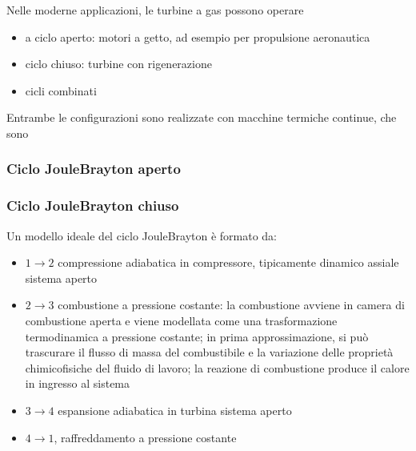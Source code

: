 \documentclass[letterpaper,10pt,italian]{jupyterBook}
\begin{document}
\sphinxAtStartPar
Nelle moderne applicazioni, le turbine a gas possono operare
\begin{itemize}
\item {} 
\sphinxAtStartPar
a ciclo aperto: motori a getto, ad esempio per propulsione aeronautica

\item {} 
\sphinxAtStartPar
ciclo chiuso: turbine con rigenerazione

\item {} 
\sphinxAtStartPar
cicli combinati

\end{itemize}

\sphinxAtStartPar
Entrambe le configurazioni sono realizzate con macchine termiche continue, che sono   


\subsubsection{Ciclo Joule\sphinxhyphen{}Brayton aperto}
\label{\detokenize{ch/thermodynamics/heat-engine-joule-brayton:ciclo-joule-brayton-aperto}}

\subsubsection{Ciclo Joule\sphinxhyphen{}Brayton chiuso}
\label{\detokenize{ch/thermodynamics/heat-engine-joule-brayton:ciclo-joule-brayton-chiuso}}
\sphinxAtStartPar
Un modello ideale del ciclo Joule\sphinxhyphen{}Brayton è formato da:
\begin{itemize}
\item {} 
\sphinxAtStartPar
\(1 \rightarrow 2\) compressione adiabatica in compressore, tipicamente dinamico assiale \sphinxhyphen{} sistema aperto

\item {} 
\sphinxAtStartPar
\(2 \rightarrow 3\) combustione a pressione costante: la combustione avviene in camera di combustione aperta e viene modellata come una trasformazione termodinamica a pressione costante; in prima approssimazione, si può trascurare il flusso di massa del combustibile e la variazione delle proprietà chimico\sphinxhyphen{}fisiche del fluido di lavoro; la reazione di combustione produce il calore in ingresso al sistema

\item {} 
\sphinxAtStartPar
\(3 \rightarrow 4\) espansione adiabatica in turbina \sphinxhyphen{} sistema aperto

\item {} 
\sphinxAtStartPar
\(4 \rightarrow 1\), raffreddamento a pressione costante

\end{itemize}
\end{document}
